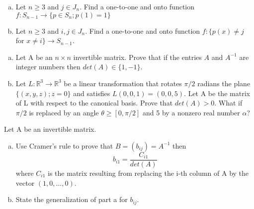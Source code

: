 \documentclass[12pt,letterpaper,cm]{hmcpset}
\begin{document}

\begin{problem}[B1]
    \begin{enumerate}[a)]
        \item Let $n\geq 3$ and $j\in J_n$. Find a one-to-one and onto function $f:S_{n-1} \rightarrow \{p\in S_n;p(1)=1\}$
        
        \item Let $n\geq 3$ and $i,j\in J_n$. Find a one-to-one and onto function $f:\{p(x)\neq j$ for $x\neq i\}\rightarrow S_{n-1}$.
    \end{enumerate}
 \end{problem}

\begin{solution}
    
\end{solution}

\pagebreak

\begin{problem}[B2]
    \begin{enumerate}[a)]
        \item Let A be an $n\times n$ invertible matrix. Prove that if the entries $A$ and $A^{-1}$ are integer numbers then $det(A)\in\{1,-1\}$.
        \item Let $L:\mathbb{R}^3\rightarrow\mathbb{R}^3$ be a linear transformation that rotates $\pi/2$ radians the plane $\{(x,y,z);z=0\}$ and satisfies $L(0,0,1)=(0,0,5)$. Let A be the matrix of L with respect to the canonical basis. Prove that $det(A) > 0$. What if $\pi/2$ is replaced by an angle $\theta\geq[0,\pi/2]$ and 5 by a nonzero real number $\alpha$?
    \end{enumerate}
\end{problem}
\begin{solution}
    
\end{solution}
\pagebreak

\begin{problem}[B3]
    Let A be an invertible matrix.
    \begin{enumerate}[a)]
        \item Use Cramer's rule to prove that $B=(b_{ij}) = A^{-1}$ then 
        $$
        b_{i1} = \frac{C_{i1}}{det(A)}
        $$
        where $C_{i1}$ is the matrix resulting from replacing the i-th column of A by the vector $(1,0,\dots,0)$.
        \item State the generalization of part a for $b_{ij}$.
    \end{enumerate}
\end{problem}
\begin{solution}
    
\end{solution}
\end{document}
